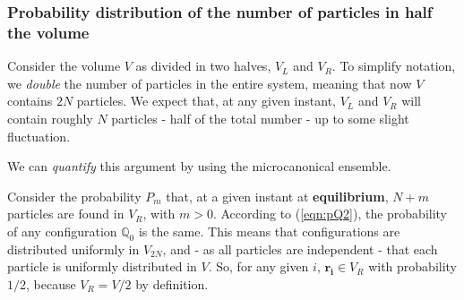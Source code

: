 \documentclass[../template.tex]{subfiles}
\begin{document}
\subsubsection{Probability distribution of the number of particles in half the volume} %
Consider the volume $V$ as divided in two halves, $V_L$ and $V_R$. To simplify notation, we \textit{double} the number of particles in the entire system, meaning that now $V$ contains $2N$ particles. We expect that, at any given instant, $V_L$ and $V_R$ will contain roughly $N$ particles - half of the total number - up to some slight fluctuation. 

\medskip

We can \textit{quantify} this argument by using the microcanonical ensemble. 

Consider the probability $P_m$ that, at a given instant at \textbf{equilibrium}, $N+m$ particles are found in $V_R$, with $m > 0$. According to (\ref{eqn:pQ2}), the probability of any configuration $\mathbb{Q}_0$ is the same. This means that configurations are distributed uniformly in $V_{2N}$, and - as all particles are independent - that each particle is uniformly distributed in $V$. So, for any given $i$, $\bm{r_i} \in V_R$ with probability $1/2$, because $V_R = V/2$ by definition. 
\end{document}
